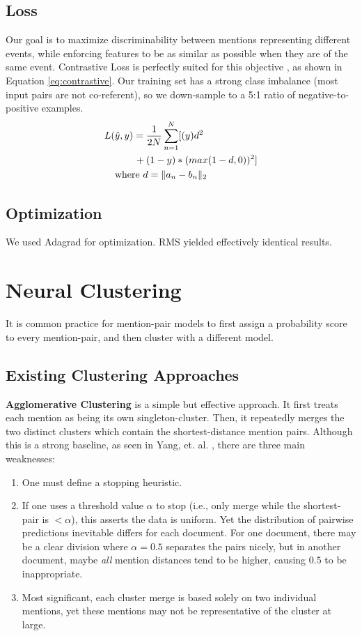 \documentclass[11pt,a4paper]{article}
\begin{document}
\subsection{Loss}
Our goal is to maximize discriminability between mentions representing different events, while enforcing features to be as similar as possible when they are of the same event.  Contrastive Loss is perfectly suited for this objective \cite{SchroffKP15,pmlr-v48-liud16}, as shown in Equation \ref{eq:contrastive}.  Our training set has a strong class imbalance (most input pairs are not co-referent), so we down-sample to a 5:1 ratio of negative-to-positive examples.
\begin{equation}
\begin{aligned}
L(&\hat{y},y)=\frac{1}{2N}\sum_{n=1}^{N}[(y)d^2 \\
&\qquad {} + (1-y)*(max(1-d,0))^2] \\
&\textnormal{where }d=\|a_{n}-b_{n}\|_{2}
\end{aligned}
\label{eq:contrastive}
\end{equation}

\subsection{Optimization}
We used Adagrad for optimization. RMS yielded effectively identical results.

\section{Neural Clustering}
\label{sec:clustering}
It is common practice for mention-pair models to first assign a probability score to every mention-pair, and then cluster with a different model.

\subsection{Existing Clustering Approaches}
\textbf{Agglomerative Clustering} is a simple but effective approach.  It first treats each mention as being its own singleton-cluster.  Then, it repeatedly merges the two distinct clusters which contain the shortest-distance mention pairs.  Although this is a strong baseline, as seen in Yang, et. al. , there are three main weaknesses:
\begin{enumerate}
\item One must define a stopping heuristic.
\item If one uses a threshold value $\alpha$ to stop (i.e., only merge while the shortest-pair is $< \alpha$), this asserts the data is uniform. Yet the distribution of pairwise predictions inevitable differs for each document.  For one document, there may be a clear division where $\alpha = 0.5$ separates the pairs nicely, but in another document, maybe \textit{all} mention distances tend to be higher, causing $0.5$ to be inappropriate.
\item Most significant, each cluster merge is based solely on two individual mentions, yet these mentions may not be representative of the cluster at large.
\end{enumerate}
\end{document}
